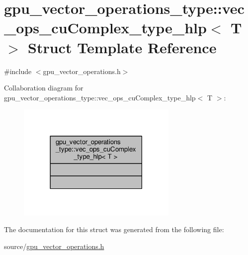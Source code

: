 \hypertarget{structgpu__vector__operations__type_1_1vec__ops__cuComplex__type__hlp}{\section{gpu\-\_\-vector\-\_\-operations\-\_\-type\-:\-:vec\-\_\-ops\-\_\-cu\-Complex\-\_\-type\-\_\-hlp$<$ T $>$ Struct Template Reference}
\label{structgpu__vector__operations__type_1_1vec__ops__cuComplex__type__hlp}
}


{\ttfamily \#include $<$gpu\-\_\-vector\-\_\-operations.\-h$>$}



Collaboration diagram for gpu\-\_\-vector\-\_\-operations\-\_\-type\-:\-:vec\-\_\-ops\-\_\-cu\-Complex\-\_\-type\-\_\-hlp$<$ T $>$\-:
\nopagebreak
\begin{figure}[H]
\begin{center}
\leavevmode
\includegraphics[width=218pt]{structgpu__vector__operations__type_1_1vec__ops__cuComplex__type__hlp__coll__graph}
\end{center}
\end{figure}


The documentation for this struct was generated from the following file\-:\begin{DoxyCompactItemize}
\item 
source/\hyperlink{gpu__vector__operations_8h}{gpu\-\_\-vector\-\_\-operations.\-h}\end{DoxyCompactItemize}
